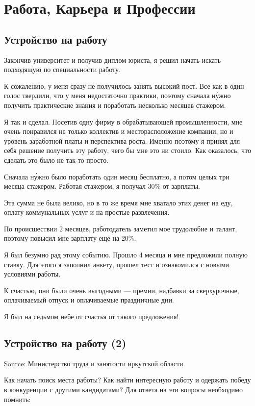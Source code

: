 \chapter{Работа, Карьера и Профессии}

\section{Устройство на работу}
Закончив университет и получив диплом юриста, я решил начать искать подходящую по специальности работу.

К сожалению, у меня сразу не получилось занять высокий пост.
Все как в один голос твердили, что у меня недостаточно практики, поэтому сначала н\'{у}жно получить практические знания и поработать несколько месяцев стажером.

Я так и сделал.
Посетив одну фирму в обрабатывающей промышленности, мне очень понравился не только коллектив и месторасположение компании, но и уровень заработной платы и перспектива роста.
Именно поэтому я принял для себя решение получить эту работу, чего бы мне это ни стоило.
Как оказалось, что сделать это было не так-то просто.

Сначала н\'{у}жно было поработать один месяц бесплатно, а потом целых три месяца стажером.
Работая стажером, я получал 30\% от зарплаты.

Эта сумма не была велико, но в то же время мне хватало этих денег на еду, оплату коммунальных услуг и на простые развлечения.

По происшествии 2 месяцев, работодатель заметил мое трудолюбие и талант, поэтому повысил мне зарплату еще на 20\%.

Я был безумно рад этому событию. Прошло 4 месяца и мне предложили полную ставку.
Для этого я заполнил анкету, прошел тест и ознакомился с новыми условиями работы.

К счастью, они были очень выгодными --- премии, надбавки за сверхурочные, оплачиваемый отпуск и оплачиваемые праздничные дни.

Я был на седьмом небе от счастья от такого предложения!

\section{Устройство на работу (2)}
Source: \href{http://irkzan.ru/home/gragd/soiskatel/soiskatelrabota.aspx}{Министерство труда и занятости иркутской области}.

Как начать поиск  места работы? Как найти интересную работу и одержать победу в конкуренции с другими кандидатами? Для ответа на эти вопросы необходимо помнить:

